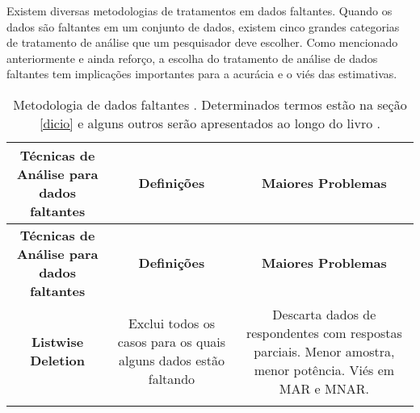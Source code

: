 \documentclass[
  openany]{book}
\begin{document}
Existem diversas metodologias de tratamentos em dados faltantes. Quando os dados são faltantes em um conjunto de dados, existem cinco grandes categorias de tratamento de análise que um pesquisador deve escolher. Como mencionado anteriormente e ainda reforço, a escolha do tratamento de análise de dados faltantes tem implicações importantes para a acurácia e o viés das estimativas.

\begin{longtable}[]{@{}ccc@{}}
\caption{\label{tab:preprocess} Metodologia de dados faltantes \citep{tecnicasinput}. Determinados termos estão na seção \ref{dicio} e alguns outros serão apresentados ao longo do livro .}\tabularnewline
\toprule
\begin{minipage}[b]{0.30\columnwidth}\centering
\textbf{Técnicas de Análise para dados faltantes}\strut
\end{minipage} & \begin{minipage}[b]{0.30\columnwidth}\centering
\textbf{Definições}\strut
\end{minipage} & \begin{minipage}[b]{0.30\columnwidth}\centering
\textbf{Maiores Problemas}\strut
\end{minipage}\tabularnewline
\midrule
\endfirsthead
\toprule
\begin{minipage}[b]{0.30\columnwidth}\centering
\textbf{Técnicas de Análise para dados faltantes}\strut
\end{minipage} & \begin{minipage}[b]{0.30\columnwidth}\centering
\textbf{Definições}\strut
\end{minipage} & \begin{minipage}[b]{0.30\columnwidth}\centering
\textbf{Maiores Problemas}\strut
\end{minipage}\tabularnewline
\midrule
\endhead
\begin{minipage}[t]{0.30\columnwidth}\centering
\textbf{Listwise Deletion}\strut
\end{minipage} & \begin{minipage}[t]{0.30\columnwidth}\centering
Exclui todos os casos para os quais alguns dados estão faltando\strut
\end{minipage} & \begin{minipage}[t]{0.30\columnwidth}\centering
Descarta dados de respondentes com respostas parciais. Menor amostra, menor potência. Viés em MAR e MNAR.\strut
\end{minipage}\tabularnewline
\begin{minipage}[t]{0.30\columnwidth}\centering

\end{minipage}
\end{longtable}
\end{document}
